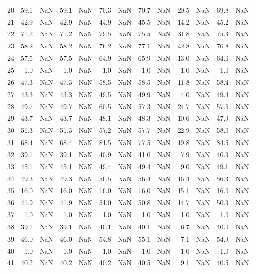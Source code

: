 \begin{tabular}{lrrrrrrrrrrrr}
20 & 59.1 & NaN & 59.1 & NaN & 70.3 & NaN & 70.7 & NaN & 20.5 & NaN & 69.8 & NaN \\
21 & 42.9 & NaN & 42.9 & NaN & 44.9 & NaN & 45.5 & NaN & 14.2 & NaN & 45.2 & NaN \\
22 & 71.2 & NaN & 71.2 & NaN & 79.5 & NaN & 75.5 & NaN & 31.8 & NaN & 75.3 & NaN \\
23 & 58.2 & NaN & 58.2 & NaN & 76.2 & NaN & 77.1 & NaN & 42.8 & NaN & 76.8 & NaN \\
24 & 57.5 & NaN & 57.5 & NaN & 64.9 & NaN & 65.9 & NaN & 13.0 & NaN & 64.6 & NaN \\
25 & 1.0 & NaN & 1.0 & NaN & 1.0 & NaN & 1.0 & NaN & 1.0 & NaN & 1.0 & NaN \\
26 & 47.3 & NaN & 47.3 & NaN & 58.5 & NaN & 58.5 & NaN & 11.8 & NaN & 58.4 & NaN \\
27 & 43.3 & NaN & 43.3 & NaN & 49.5 & NaN & 49.9 & NaN & 4.0 & NaN & 49.4 & NaN \\
28 & 49.7 & NaN & 49.7 & NaN & 60.5 & NaN & 57.3 & NaN & 24.7 & NaN & 57.6 & NaN \\
29 & 43.7 & NaN & 43.7 & NaN & 48.1 & NaN & 48.3 & NaN & 10.6 & NaN & 47.9 & NaN \\
30 & 51.3 & NaN & 51.3 & NaN & 57.2 & NaN & 57.7 & NaN & 22.9 & NaN & 58.0 & NaN \\
31 & 68.4 & NaN & 68.4 & NaN & 81.5 & NaN & 77.5 & NaN & 19.8 & NaN & 84.5 & NaN \\
32 & 39.1 & NaN & 39.1 & NaN & 40.9 & NaN & 41.0 & NaN & 7.9 & NaN & 40.9 & NaN \\
33 & 45.1 & NaN & 45.1 & NaN & 49.4 & NaN & 49.4 & NaN & 9.0 & NaN & 49.1 & NaN \\
34 & 49.3 & NaN & 49.3 & NaN & 56.5 & NaN & 56.4 & NaN & 16.4 & NaN & 56.3 & NaN \\
35 & 16.0 & NaN & 16.0 & NaN & 16.0 & NaN & 16.0 & NaN & 15.1 & NaN & 16.0 & NaN \\
36 & 41.9 & NaN & 41.9 & NaN & 51.0 & NaN & 50.8 & NaN & 14.7 & NaN & 50.9 & NaN \\
37 & 1.0 & NaN & 1.0 & NaN & 1.0 & NaN & 1.0 & NaN & 1.0 & NaN & 1.0 & NaN \\
38 & 39.1 & NaN & 39.1 & NaN & 40.1 & NaN & 40.1 & NaN & 6.7 & NaN & 40.0 & NaN \\
39 & 46.0 & NaN & 46.0 & NaN & 54.8 & NaN & 55.1 & NaN & 7.1 & NaN & 54.9 & NaN \\
40 & 1.0 & NaN & 1.0 & NaN & 1.0 & NaN & 1.0 & NaN & 1.0 & NaN & 1.0 & NaN \\
41 & 40.2 & NaN & 40.2 & NaN & 40.2 & NaN & 40.5 & NaN & 9.1 & NaN & 40.5 & NaN \\

\end{tabular}
